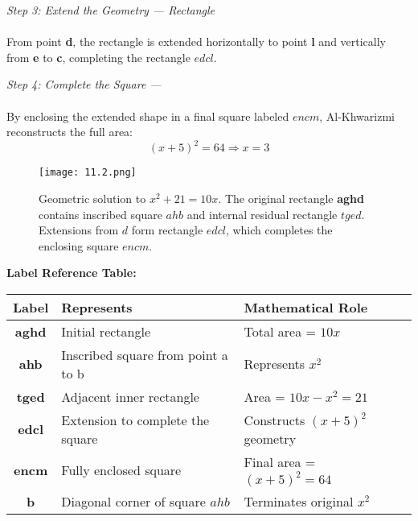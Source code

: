\documentclass[9pt]{article}
\begin{document}
\vspace{0.5em}

\textit{Step 3: Extend the Geometry — Rectangle } \\\\
From point \textbf{d}, the rectangle is extended horizontally to point \textbf{l} and vertically from \textbf{e} to \textbf{c}, completing the rectangle $edcl$.

\vspace{0.5em}

\textit{Step 4: Complete the Square — } \\\\
By enclosing the extended shape in a final square labeled $encm$, Al-Khwarizmi reconstructs the full area:
\[
(x + 5)^2 = 64
\Rightarrow x = 3
\]


\vspace{1em}

\begin{figure}[H]
  \centering
  \texttt{[image: 11.2.png]}
  \caption{Geometric solution to $x^2 + 21 = 10x$. The original rectangle \textbf{aghd} contains inscribed square $ahb$ and internal residual rectangle $tged$. Extensions from $d$ form rectangle $edcl$, which completes the enclosing square $encm$.}
\end{figure}

\vspace{1em}

\textbf{Label Reference Table:}
\begin{center}
\begin{tabular}{|c|l|l|}
\hline
\textbf{Label} & \textbf{Represents} & \textbf{Mathematical Role} \\\hline
\textbf{aghd} & Initial rectangle & Total area = $10x$ \\\hline
\textbf{ahb} & Inscribed square from point a to b & Represents $x^2$ \\\hline
\textbf{tged} & Adjacent inner rectangle & Area = $10x - x^2 = 21$ \\\hline
\textbf{edcl} & Extension to complete the square & Constructs $(x + 5)^2$ geometry \\\hline
\textbf{encm} & Fully enclosed square & Final area = $(x + 5)^2 = 64$ \\\hline
\textbf{b} & Diagonal corner of square $ahb$ & Terminates original $x^2$ \\\hline
\end{tabular}
\end{center}
\end{document}
